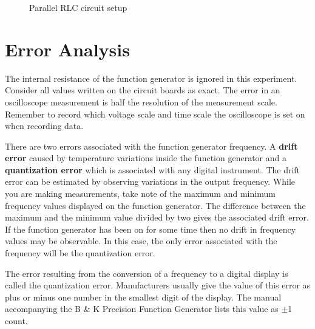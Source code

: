 \begin{figure}
\caption{Parallel RLC circuit setup}
\label{fig:rc5}
\end{figure}

\section{Error Analysis}
The internal resistance of the function generator is ignored in this experiment. Consider all values written on the circuit boards as exact. The error in an oscilloscope measurement is half the resolution of the measurement scale. Remember to record which voltage scale and time scale the oscilloscope is set on when recording data. 

There are two errors associated with the function generator frequency. A {\bf drift error} caused by temperature variations inside the function generator and a {\bf quantization error} which is associated with any digital instrument. The drift error can be estimated by observing variations in the output frequency. While you are making measurements, take note of the maximum and minimum frequency values displayed on the function generator. The difference between the maximum and the minimum value divided by two gives the associated drift error. If the function generator has been on for some time then no drift in frequency values may be observable. In this case, the only error associated with the frequency will be the quantization error. 

The error resulting from the conversion of a frequency to a digital display is called the quantization error. Manufacturers usually give the value of this error as plus or minus one number in the smallest digit of the display. The manual accompanying the B \& K Precision Function Generator lists this value as $\pm$1 count.

